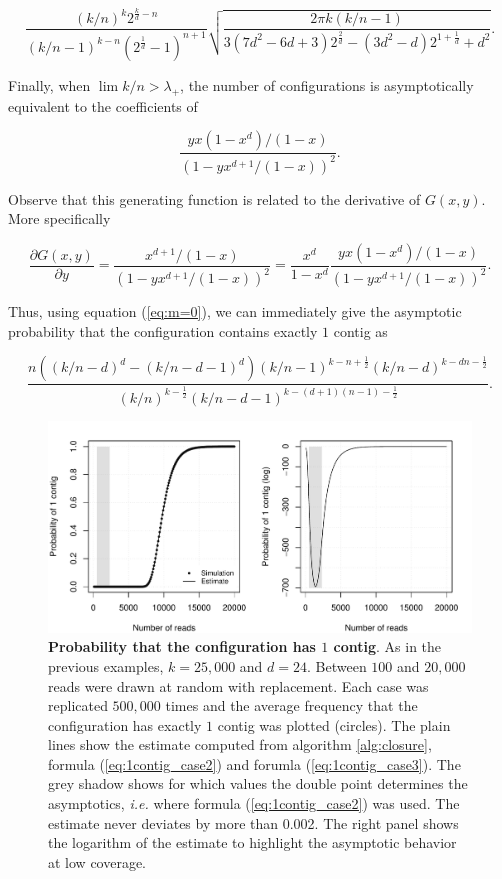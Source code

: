 \documentclass{article}
\begin{document}
\begin{equation}
\label{eq:1contig_case2}
\frac{(k/n)^k2^{\frac{k}{d}-n}}{(k/n-1)^{k-n} (2^{\frac{1}{d}}-1)^{n+1}}
\sqrt{\frac{2\pi k(k/n-1)}{3(7d^2-6d+3)2^{\frac{2}{d}}-
(3d^2-d)2^{1+\frac{1}{d}} +d^2 }}.
\end{equation}

Finally, when $\lim k/n > \lambda_+$, the number of configurations is
asymptotically equivalent to the coefficients of

\begin{equation*}
\frac{yx(1-x^d)/(1-x)}{\left( 1-yx^{d+1}/(1-x) \right)^2}.
\end{equation*}

Observe that this generating function is related to the derivative of
$G(x,y)$. More specifically

\begin{equation*}
\frac{\partial G(x,y)}{\partial y} =
\frac{x^{d+1}/(1-x)}{\left( 1-yx^{d+1}/(1-x) \right)^2} =
\frac{x^d}{1-x^d}\frac{yx(1-x^d)/(1-x)}{\left( 1-yx^{d+1}/(1-x)
\right)^2}.
\end{equation*}

Thus, using equation (\ref{eq:m=0}), we can immediately give the asymptotic
probability that the configuration contains exactly $1$ contig as

\begin{equation}
\label{eq:1contig_case3}
\frac{n((k/n-d)^d-(k/n-d-1)^d)(k/n-1)^{k-n+\frac{1}{2}}
(k/n-d)^{k-dn-\frac{1}{2}}}
{(k/n)^{k-\frac{1}{2}}(k/n-d-1)^{k-(d+1)(n-1)-\frac{1}{2}}}.
\end{equation}

\begin{figure}[h]
\centering
\includegraphics[scale=0.55]{Fig6.pdf}
\caption{\textbf{Probability that the configuration has $1$ contig}.
As in the previous examples, $k=25,000$ and $d=24$. Between $100$ and
$20,000$ reads were drawn at random with replacement. Each case was
replicated $500,000$ times and the average frequency that the
configuration has exactly $1$ contig was plotted (circles). The plain
lines show the estimate computed from algorithm \ref{alg:closure}, formula
(\ref{eq:1contig_case2}) and forumla (\ref{eq:1contig_case3}).
The grey shadow shows for which values the double point determines the
asymptotics, \textit{i.e.} where formula (\ref{eq:1contig_case2}) was
used. The estimate never deviates by more than 0.002. The right panel
shows the logarithm of the estimate to highlight the asymptotic behavior
at low coverage.}
\label{fig:1contig}
\end{figure}
\end{document}

